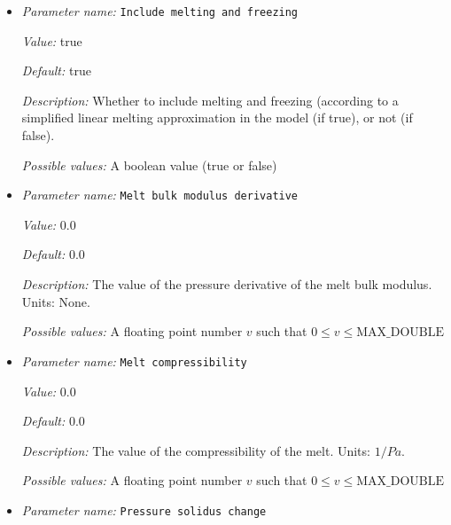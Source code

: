 \begin{itemize}
{\it Default:} 27


{\it Description:} The porosity dependence of the viscosity. Units: dimensionless.


{\it Possible values:} A floating point number $v$ such that $0 \leq v \leq \text{MAX\_DOUBLE}$
\item {\it Parameter name:} {\tt Include melting and freezing}
\label{parameters:Material model/Melt global/Include melting and freezing}


{\it Value:} true


{\it Default:} true


{\it Description:} Whether to include melting and freezing (according to a simplified linear melting approximation in the model (if true), or not (if false).


{\it Possible values:} A boolean value (true or false)
\item {\it Parameter name:} {\tt Melt bulk modulus derivative}
\label{parameters:Material model/Melt global/Melt bulk modulus derivative}


{\it Value:} 0.0


{\it Default:} 0.0


{\it Description:} The value of the pressure derivative of the melt bulk modulus. Units: None.


{\it Possible values:} A floating point number $v$ such that $0 \leq v \leq \text{MAX\_DOUBLE}$
\item {\it Parameter name:} {\tt Melt compressibility}
\label{parameters:Material model/Melt global/Melt compressibility}


{\it Value:} 0.0


{\it Default:} 0.0


{\it Description:} The value of the compressibility of the melt. Units: $1/Pa$.


{\it Possible values:} A floating point number $v$ such that $0 \leq v \leq \text{MAX\_DOUBLE}$
\item {\it Parameter name:} {\tt Pressure solidus change}
\label{parameters:Material model/Melt global/Pressure solidus change}



\end{itemize}
